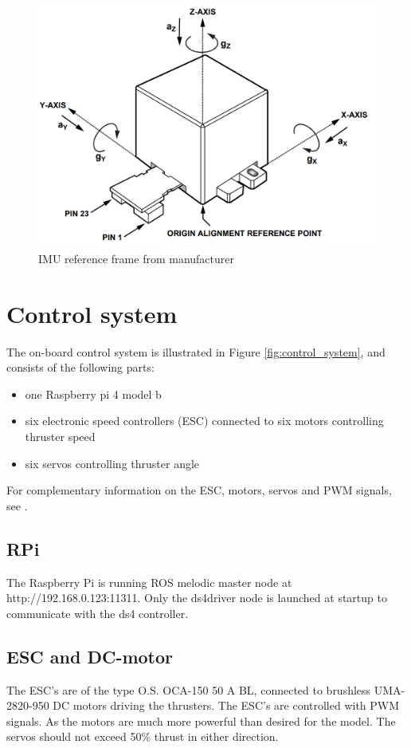 \begin{figure}[htb!]
	\centering
	\includegraphics[width=0.6\linewidth]{fig/IMU_reference_frame.png}
	\caption{IMU reference frame from manufacturer}
	\label{fig:IMU_reference_frame}
\end{figure}

\section{Control system}
The on-board control system is illustrated in Figure \ref{fig:control_system}, and consists of the following parts:
\begin{itemize}
	\item one Raspberry pi 4 model b
	\item six electronic speed controllers (ESC) connected to six motors controlling thruster speed
	\item six servos controlling thruster angle
\end{itemize}
For complementary information on the ESC, motors, servos and PWM signals, see \cite{bjorno2016thruster}.
\subsection{RPi}
The Raspberry Pi is running ROS melodic master node at http://192.168.0.123:11311.
Only the ds4\textunderscore driver \textunderscore node is launched at startup to communicate with the ds4 controller. 

\subsection{ESC and DC-motor}
The ESC's are of the type O.S. OCA-150 50 A BL, connected to brushless UMA-2820-950 DC motors driving the thrusters. The ESC's are controlled with PWM signals. As the motors are much more powerful than desired for the model. The servos should not exceed 50\% thrust in either direction.



